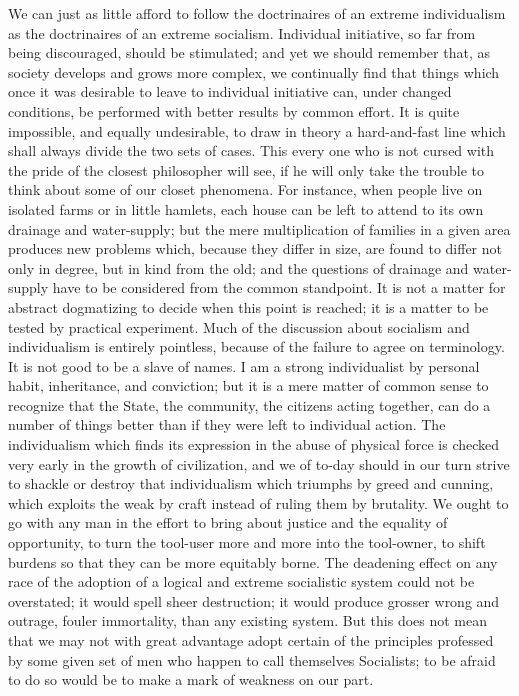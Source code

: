 \documentclass{scrbook}
\begin{document}
We can just as little afford to follow the doctrinaires of an extreme individualism as the
doctrinaires of an extreme socialism. Individual initiative, so far from being discouraged,
should be stimulated; and yet we should remember that, as society develops and grows more
complex, we continually find that things which once it was desirable to leave to individual
initiative can, under changed conditions, be performed with better results by common effort.
It is quite impossible, and equally undesirable, to draw in theory a hard-and-fast line which
shall always divide the two sets of cases. This every one who is not cursed with the pride of
the closest philosopher will see, if he will only take the trouble to think about some of our
closet phenomena. For instance, when people live on isolated farms or in little hamlets, each
house can be left to attend to its own drainage and water-supply; but the mere multiplication
of families in a given area produces new problems which, because they differ in size, are
found to differ not only in degree, but in kind from the old; and the questions of drainage
and water-supply have to be considered from the common standpoint. It is not a matter
for abstract dogmatizing to decide when this point is reached; it is a matter to be tested by
practical experiment. Much of the discussion about socialism and individualism is entirely
pointless, because of the failure to agree on terminology. It is not good to be a slave of
names. I am a strong individualist by personal habit, inheritance, and conviction; but it is
a mere matter of common sense to recognize that the State, the community, the citizens
acting together, can do a number of things better than if they were left to individual action.
The individualism which finds its expression in the abuse of physical force is checked very
early in the growth of civilization, and we of to-day should in our turn strive to shackle or
destroy that individualism which triumphs by greed and cunning, which exploits the weak
by craft instead of ruling them by brutality. We ought to go with any man in the effort to
bring about justice and the equality of opportunity, to turn the tool-user more and more into
the tool-owner, to shift burdens so that they can be more equitably borne. The deadening
effect on any race of the adoption of a logical and extreme socialistic system could not be
overstated; it would spell sheer destruction; it would produce grosser wrong and outrage,
fouler immortality, than any existing system. But this does not mean that we may not with
great advantage adopt certain of the principles professed by some given set of men who
happen to call themselves Socialists; to be afraid to do so would be to make a mark of
weakness on our part.
\end{document}
